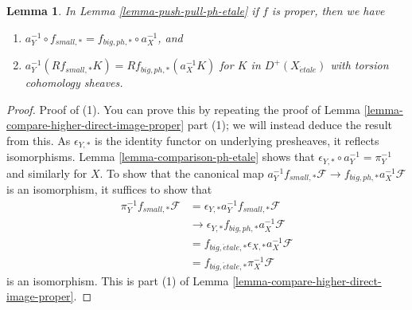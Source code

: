 \documentclass{stacks-project}
\theoremstyle{plain}
\newtheorem{lemma}[subsection]{Lemma}
\theoremstyle{definition}
\theoremstyle{remark}
\numberwithin{equation}{subsection}
\def\etale{{\acute{e}tale}}
\begin{document}
\begin{lemma}
\label{lemma-proper-push-pull-ph-etale}
In Lemma \ref{lemma-push-pull-ph-etale} if $f$ is proper, then we have
\begin{enumerate}
\item $a_Y^{-1} \circ f_{small, *} = f_{big, ph, *} \circ a_X^{-1}$, and
\item
$a_Y^{-1}(Rf_{small, *}K) = Rf_{big, ph, *}(a_X^{-1}K)$
for $K$ in $D^+(X_\etale)$ with torsion cohomology sheaves.
\end{enumerate}
\end{lemma}

\begin{proof}
Proof of (1). You can prove this by repeating the proof of
Lemma \ref{lemma-compare-higher-direct-image-proper} part (1);
we will instead deduce the result from this.
As $\epsilon_{Y, *}$ is the identity functor on underlying presheaves,
it reflects isomorphisms. Lemma \ref{lemma-comparison-ph-etale}
shows that $\epsilon_{Y, *} \circ a_Y^{-1} = \pi_Y^{-1}$
and similarly for $X$. To show that the canonical map
$a_Y^{-1}f_{small, *}\mathcal{F} \to f_{big, ph, *}a_X^{-1}\mathcal{F}$
is an isomorphism, it suffices to show that
\begin{align*}
\pi_Y^{-1}f_{small, *}\mathcal{F}
& =
\epsilon_{Y, *}a_Y^{-1}f_{small, *}\mathcal{F} \\
& \to 
\epsilon_{Y, *}f_{big, ph, *}a_X^{-1}\mathcal{F} \\
& =
f_{big, \etale, *} \epsilon_{X, *}a_X^{-1}\mathcal{F} \\
& =
f_{big, \etale, *}\pi_X^{-1}\mathcal{F}
\end{align*}
is an isomorphism. This is part
(1) of Lemma \ref{lemma-compare-higher-direct-image-proper}.


\end{proof}
\end{document}
